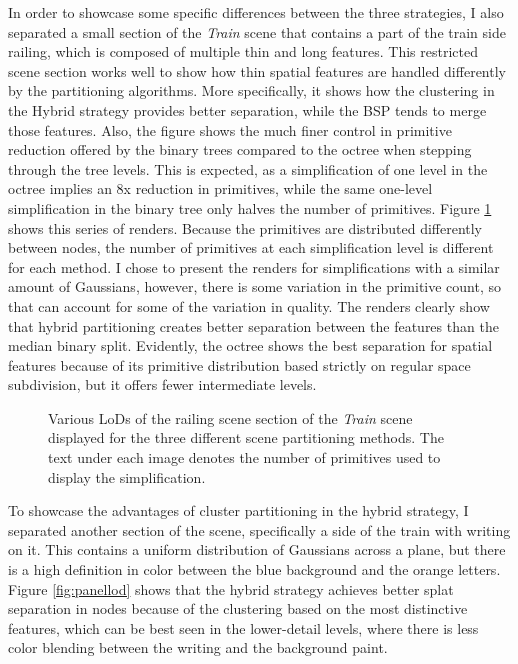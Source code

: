 In order to showcase some specific differences between the three strategies, I also separated a small section of the \textit{Train} scene that contains a part of the train side railing, which is composed of multiple thin and long features. This restricted scene section works well to show how thin spatial features are handled differently by the partitioning algorithms. More specifically, it shows how the clustering in the Hybrid strategy provides better separation, while the BSP tends to merge those features. Also, the figure shows the much finer control in primitive reduction offered by the binary trees compared to the octree when stepping through the tree levels. This is expected, as a simplification of one level in the octree implies an 8x reduction in primitives, while the same one-level simplification in the binary tree only halves the number of primitives. Figure \ref{fig:railing} shows this series of renders. Because the primitives are distributed differently between nodes, the number of primitives at each simplification level is different for each method. I chose to present the renders for simplifications with a similar amount of Gaussians, however, there is some variation in the primitive count, so that can account for some of the variation in quality. The renders clearly show that hybrid partitioning creates better separation between the features than the median binary split. Evidently, the octree shows the best separation for spatial features because of its primitive distribution based strictly on regular space subdivision, but it offers fewer intermediate levels.

\begin{figure}[H]
    \centering
    
    \caption{Various LoDs of the railing scene section of the \textit{Train} scene displayed for the three different scene partitioning methods. The text under each image denotes the number of primitives used to display the simplification.}
    \label{fig:railing}
\end{figure}

To showcase the advantages of cluster partitioning in the hybrid strategy, I separated another section of the scene, specifically a side of the train with writing on it. This contains a uniform distribution of Gaussians across a plane, but there is a high definition in color between the blue background and the orange letters. Figure \ref{fig:panellod} shows that the hybrid strategy achieves better splat separation in nodes because of the clustering based on the most distinctive features, which can be best seen in the lower-detail levels, where there is less color blending between the writing and the background paint.

